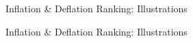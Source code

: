 \documentclass[xcolor=dvipsnames]{beamer}
\begin{document}
\begin{frame}{Inflation \& Deflation Ranking: Illustrations}
\begin{figure}
\end{figure}
\end{frame}

\begin{frame}{Inflation \& Deflation Ranking: Illustrations}
\begin{figure}
\end{figure}
\end{frame}
\end{document}
